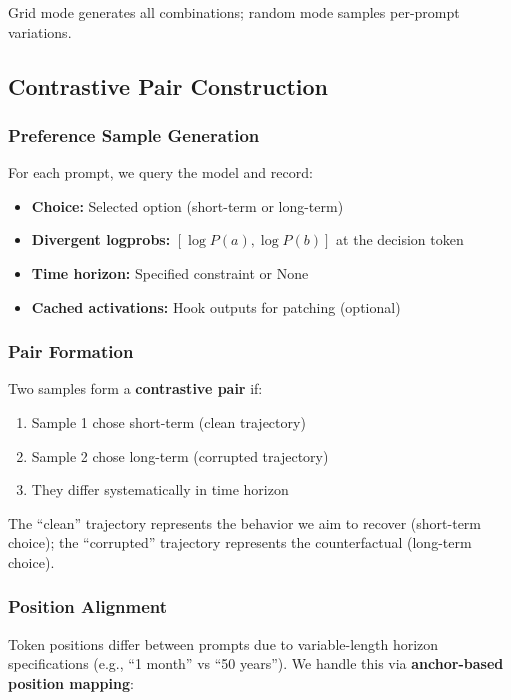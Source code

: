 \documentclass{article}
\begin{document}
Grid mode generates all combinations; random mode samples per-prompt variations.

\subsection{Contrastive Pair Construction}

\subsubsection{Preference Sample Generation}

For each prompt, we query the model and record:
\begin{itemize}
    \item \textbf{Choice:} Selected option (short-term or long-term)
    \item \textbf{Divergent logprobs:} $[\log P(a), \log P(b)]$ at the decision token
    \item \textbf{Time horizon:} Specified constraint or None
    \item \textbf{Cached activations:} Hook outputs for patching (optional)
\end{itemize}

\subsubsection{Pair Formation}

Two samples form a \textbf{contrastive pair} if:
\begin{enumerate}
    \item Sample 1 chose short-term (clean trajectory)
    \item Sample 2 chose long-term (corrupted trajectory)
    \item They differ systematically in time horizon
\end{enumerate}

The ``clean'' trajectory represents the behavior we aim to recover (short-term choice); the ``corrupted'' trajectory represents the counterfactual (long-term choice).

\subsubsection{Position Alignment}

Token positions differ between prompts due to variable-length horizon specifications (e.g., ``1 month'' vs ``50 years''). We handle this via \textbf{anchor-based position mapping}:
\end{document}
